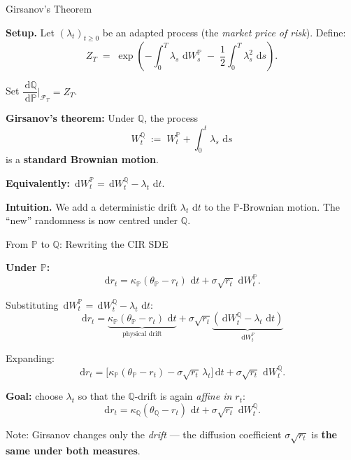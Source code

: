 \documentclass[compress]{beamer}
\newcommand{\PP}{\mathbb{P}}
\newcommand{\QQ}{\mathbb{Q}}
\newcommand{\FF}{\mathcal{F}}
\newcommand{\dd}{\,\mathrm{d}}
\begin{document}
\begin{frame}{Girsanov's Theorem}

\textbf{Setup.}  Let $(\lambda_t)_{t\ge 0}$ be an adapted process (the \textit{market price of risk}). Define:
\[
	Z_T \;=\; \exp\!\left(-\int_0^T \lambda_s\,\dd W_s^\PP \;-\; \frac{1}{2}\int_0^T \lambda_s^2\,\dd s\right).
\]

Set $\dfrac{\dd\QQ}{\dd\PP}\Big|_{\FF_T} = Z_T$.

\medskip
\textbf{Girsanov's theorem:}  Under $\QQ$, the process
\[
	W_t^\QQ \;:=\; W_t^\PP + \int_0^t \lambda_s\,\dd s
\]
is a \textbf{standard Brownian motion}.

\medskip
\textbf{Equivalently:} $\dd W_t^\PP = \dd W_t^\QQ - \lambda_t\,\dd t$.

\medskip
\textbf{Intuition.} We add a deterministic drift $\lambda_t\,\dd t$ to the $\PP$-Brownian motion. The ``new'' randomness is now centred under $\QQ$.

\end{frame}

\begin{frame}{From $\PP$ to $\QQ$: Rewriting the CIR SDE}

\textbf{Under $\PP$:}
\[
	\dd r_t = \kappa_\PP(\theta_\PP - r_t)\,\dd t + \sigma\sqrt{r_t}\,\dd W_t^\PP.
\]

Substituting $\dd W_t^\PP = \dd W_t^\QQ - \lambda_t\,\dd t$:
\[
	\dd r_t
	= \underbrace{\kappa_\PP(\theta_\PP - r_t)\,\dd t}_{\text{physical drift}}
	+ \sigma\sqrt{r_t}\!\underbrace{(\dd W_t^\QQ - \lambda_t\,\dd t)}_{\dd W_t^\PP}
\]

\medskip
Expanding:
\[
	\dd r_t
	= \Big[\kappa_\PP(\theta_\PP - r_t) - \sigma\sqrt{r_t}\,\lambda_t\Big]\dd t
	+ \sigma\sqrt{r_t}\,\dd W_t^\QQ.
\]

\medskip
\textbf{Goal:} choose $\lambda_t$ so that the $\QQ$-drift is again \textit{affine in $r_t$}:
\[
	\dd r_t = \kappa_\QQ(\theta_\QQ - r_t)\,\dd t + \sigma\sqrt{r_t}\,\dd W_t^\QQ.
\]

Note: Girsanov changes only the \textit{drift} — the diffusion coefficient $\sigma\sqrt{r_t}$ is \textbf{the same under both measures}.

\end{frame}
\end{document}
